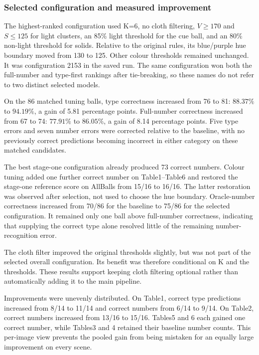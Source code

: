 \subsubsection{Selected configuration and measured improvement}




The highest-ranked configuration used K=6, no cloth filtering,
$V\geq170$ and $S\leq125$ for light clusters, an 85\% light threshold
for the cue ball, and an 80\% non-light threshold for solids. Relative to
the original rules, its blue/purple hue boundary moved from 130 to 125.
Other colour thresholds remained unchanged. It was configuration 2153
in the saved run. The same configuration won both the full-number and
type-first rankings after tie-breaking, so these names do not refer to
two distinct selected models.

On the 86 matched tuning balls, type correctness increased from 76 to 81:
$88.37\%$ to $94.19\%$, a gain of 5.81 percentage points. Full-number
correctness increased from 67 to 74: $77.91\%$ to $86.05\%$, a gain of
8.14 percentage points. Five type errors and seven number errors were
corrected relative to the baseline, with no previously correct predictions
becoming incorrect in either category on these matched candidates.

The best stage-one configuration already produced 73 correct numbers.
Colour tuning added one further correct number on Table1--Table6 and
restored the stage-one reference score on AllBalls from 15/16 to 16/16.
The latter restoration was observed after selection, not used to choose
the hue boundary. Oracle-number correctness increased from 70/86 for the
baseline to 75/86 for the selected configuration. It remained only one
ball above full-number correctness, indicating that supplying the correct
type alone resolved little of the remaining number-recognition error.

The cloth filter improved the original thresholds slightly, but was not
part of the selected overall configuration. Its benefit was therefore
conditional on K and the thresholds. These results support keeping cloth
filtering optional rather than automatically adding it to the main pipeline.



Improvements were unevenly distributed. On Table1, correct type predictions
increased from 8/14 to 11/14 and correct numbers from 6/14 to 9/14. On
Table2, correct numbers increased from 13/16 to 15/16. Tables5 and 6 each
gained one correct number, while Tables3 and 4 retained their baseline
number counts. This per-image view prevents the pooled gain from being
mistaken for an equally large improvement on every scene.

